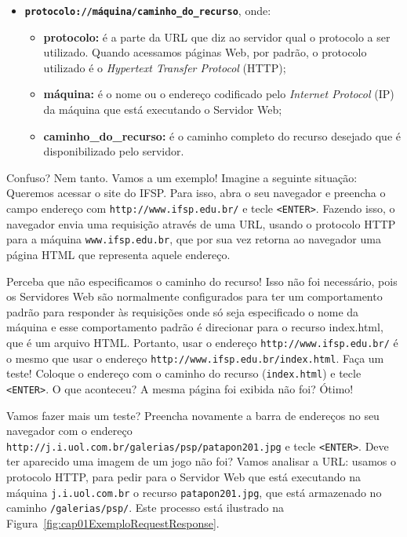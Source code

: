 \begin{itemize}

    \item \textbf{\texttt{protocolo://máquina/caminho\_do\_recurso}}, onde:
    
    \begin{itemize}
    
        \item \textbf{protocolo:} é a parte da URL que diz ao servidor qual o protocolo a ser utilizado. Quando acessamos páginas Web, por padrão, o protocolo utilizado é o \textit{Hypertext Transfer Protocol} (HTTP);
        
        \item \textbf{máquina:} é o nome ou o endereço codificado pelo \textit{Internet Protocol} (IP) da máquina que está executando o Servidor Web;
        
        \item \textbf{caminho\_do\_recurso:} é o caminho completo do recurso desejado que é disponibilizado pelo servidor.
        
    \end{itemize}
    
\end{itemize}

Confuso? Nem tanto. Vamos a um exemplo! Imagine a seguinte situação: Queremos acessar o site do IFSP. Para isso, abra o seu navegador e preencha o campo endereço com \texttt{http://www.ifsp.edu.br/} e tecle \texttt{<ENTER>}. Fazendo isso, o navegador envia uma requisição através de uma URL, usando o protocolo HTTP para a máquina \texttt{www.ifsp.edu.br}, que por sua vez retorna ao navegador uma página HTML que representa aquele endereço. 

Perceba que não especificamos o caminho do recurso! Isso não foi necessário, pois os Servidores Web são normalmente configurados para ter um comportamento padrão para responder às requisições onde só seja especificado o nome da máquina e esse comportamento padrão é direcionar para o recurso index.html, que é um arquivo HTML. Portanto, usar o endereço \texttt{http://www.ifsp.edu.br/} é o mesmo que usar o endereço \texttt{http://www.ifsp.edu.br/index.html}. Faça um teste! Coloque o endereço com o caminho do recurso (\texttt{index.html}) e tecle \texttt{<ENTER>}. O que aconteceu? A mesma página foi exibida não foi? Ótimo!

Vamos fazer mais um teste? Preencha novamente a barra de endereços no seu navegador com o endereço \texttt{http://j.i.uol.com.br/galerias/psp/patapon201.jpg} e tecle \texttt{<ENTER>}. Deve ter aparecido uma imagem de um jogo não foi? Vamos analisar a URL: usamos o protocolo HTTP, para pedir para o Servidor Web que está executando na máquina \texttt{j.i.uol.com.br} o recurso \texttt{patapon201.jpg}, que está armazenado no caminho \texttt{/galerias/psp/}. Este processo está ilustrado na Figura~\ref{fig:cap01ExemploRequestResponse}.

